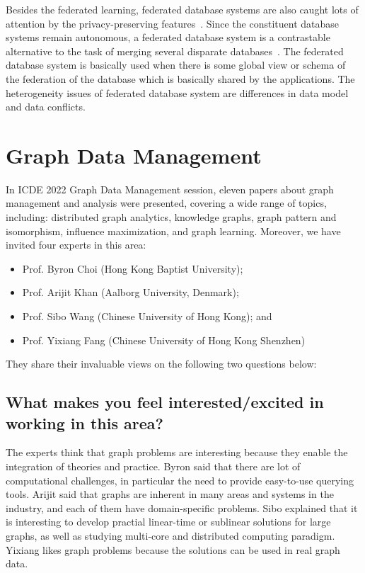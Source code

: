 \documentclass[11pt,dvipdfm]{article}
\begin{document}
Besides the federated learning, federated database systems are also caught lots of attention by the privacy-preserving features~\cite{larson2018federated,gupta2016cross}. Since the constituent database systems remain autonomous, a federated database system is a contrastable alternative to the task of merging several disparate databases~\cite{sheth1990federated}. The federated database system is basically used when there is some global view or schema of the federation of the database which is basically shared by the applications. The heterogeneity issues of federated database system are differences in data model and data conflicts.


\section{Graph Data Management}

In ICDE 2022 Graph Data Management session, eleven papers about graph management and analysis were presented, covering a wide range of topics, including: distributed graph analytics, knowledge graphs, graph pattern and isomorphism, influence maximization, and graph learning.  Moreover, we have invited four experts in this area:

\begin{itemize}
\item Prof. Byron Choi (Hong Kong Baptist University);
\item Prof. Arijit Khan (Aalborg University, Denmark);
\item Prof. Sibo Wang (Chinese University of Hong Kong); and
\item Prof. Yixiang Fang (Chinese University of Hong Kong Shenzhen)
\end{itemize}

They share their invaluable views on the following two questions below:

\subsection{What makes you feel interested/excited in working in this area?}

The experts think that graph problems are interesting because they enable the integration of theories and practice. Byron said that there are lot of computational challenges, in particular the need to provide easy-to-use querying tools.  Arijit said that graphs are inherent in many areas and systems in the industry, and each of them have domain-specific problems. Sibo explained that it is interesting to develop practial linear-time or sublinear solutions for large graphs, as well as studying multi-core and distributed computing paradigm. Yixiang likes graph problems because the solutions can be used in real graph data.
\end{document}
